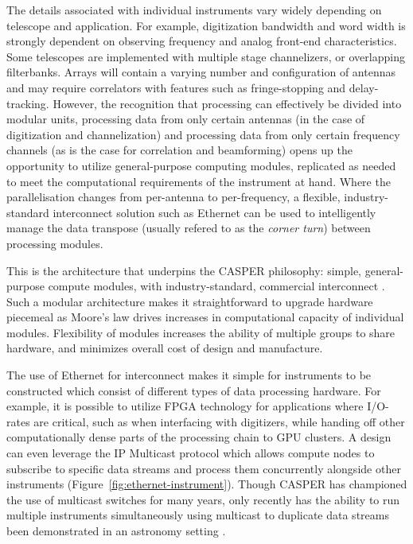 \documentclass{ws-jai}
\begin{document}
The details associated with individual instruments vary widely depending
on telescope and application. For example, digitization bandwidth and word width
is strongly dependent on observing frequency and analog front-end
characteristics. Some telescopes are implemented with
multiple stage channelizers, or overlapping filterbanks. Arrays will contain a varying number and configuration of antennas and may require correlators with features such as fringe-stopping and delay-tracking.
However, the recognition that
processing can effectively be divided into modular units, processing data
from only certain antennas (in the case of digitization and channelization) and
 processing data from only certain frequency channels (as is the case for
correlation and beamforming) opens up the opportunity to utilize
general-purpose computing modules, replicated as needed to meet the computational
requirements of the instrument at hand. Where the parallelisation changes from
per-antenna to per-frequency, a flexible, industry-standard interconnect
solution such as Ethernet can be used to intelligently manage the
data transpose (usually refered to as the \emph{corner turn}) between
processing modules.

This is the architecture that underpins the CASPER philosophy: simple,
general-purpose compute modules, with industry-standard, commercial
interconnect \citep{parsons-petaop, parsons2008scalable, pars05}. Such a modular architecture makes it straightforward to upgrade hardware
piecemeal as Moore's law drives increases in computational capacity of
individual modules. Flexibility of modules increases the ability of multiple
groups to share hardware, and minimizes overall cost of design and manufacture.

The use of Ethernet for interconnect makes it simple for instruments to be
constructed which consist of different types of data processing hardware. For example, it is possible
to utilize FPGA technology for applications where I/O-rates are critical, such
as when interfacing with digitizers, while handing off other computationally
dense parts of the processing chain to GPU clusters. A
design can even leverage the IP Multicast protocol
which allows compute nodes to subscribe to
specific data streams and process them concurrently alongside other instruments (Figure~\ref{fig:ethernet-instrument}).
Though CASPER has championed the use of multicast switches for many years, only recently has the ability to run multiple instruments simultaneously using multicast to duplicate data streams been demonstrated in an astronomy setting \citep{man14}. 
\end{document}
